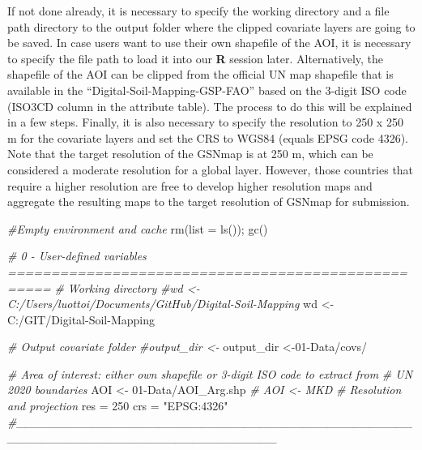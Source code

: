 \documentclass[
  10pt,
  b5paper,
  oneside]{book}
\newenvironment{Shaded}{\begin{snugshade}}{\end{snugshade}}
\newcommand{\AttributeTok}[1]{\textcolor[rgb]{0.77,0.63,0.00}{#1}}
\newcommand{\CommentTok}[1]{\textcolor[rgb]{0.56,0.35,0.01}{\textit{#1}}}
\newcommand{\DecValTok}[1]{\textcolor[rgb]{0.00,0.00,0.81}{#1}}
\newcommand{\FunctionTok}[1]{\textcolor[rgb]{0.00,0.00,0.00}{#1}}
\newcommand{\NormalTok}[1]{#1}
\newcommand{\OtherTok}[1]{\textcolor[rgb]{0.56,0.35,0.01}{#1}}
\newcommand{\StringTok}[1]{\textcolor[rgb]{0.31,0.60,0.02}{#1}}
\begin{document}
If not done already, it is necessary to specify the working directory and a file path directory to the output folder where the clipped covariate layers are going to be saved. In case users want to use their own shapefile of the AOI, it is necessary to specify the file path to load it into our \textbf{R} session later. Alternatively, the shapefile of the AOI can be clipped from the official UN map shapefile that is available in the ``Digital-Soil-Mapping-GSP-FAO'' based on the 3-digit ISO code (ISO3CD column in the attribute table). The process to do this will be explained in a few steps. Finally, it is also necessary to specify the resolution to 250 x 250 m for the covariate layers and set the CRS to WGS84 (equals EPSG code 4326). Note that the target resolution of the GSNmap is at 250 m, which can be considered a moderate resolution for a global layer. However, those countries that require a higher resolution are free to develop higher resolution maps and aggregate the resulting maps to the target resolution of GSNmap for submission.

\begin{Shaded}
\begin{Highlighting}[]
\CommentTok{\#Empty environment and cache}
\FunctionTok{rm}\NormalTok{(}\AttributeTok{list =} \FunctionTok{ls}\NormalTok{());}
\FunctionTok{gc}\NormalTok{()}

\CommentTok{\# 0 {-} User{-}defined variables ===================================================}
\CommentTok{\# Working directory}
\CommentTok{\#wd \textless{}{-} \textquotesingle{}C:/Users/luottoi/Documents/GitHub/Digital{-}Soil{-}Mapping\textquotesingle{}}
\NormalTok{wd }\OtherTok{\textless{}{-}} \StringTok{\textquotesingle{}C:/GIT/Digital{-}Soil{-}Mapping\textquotesingle{}}

\CommentTok{\# Output covariate folder}
\CommentTok{\#output\_dir \textless{}{-}\textquotesingle{}\textquotesingle{}}
\NormalTok{output\_dir }\OtherTok{\textless{}{-}}\StringTok{\textquotesingle{}01{-}Data/covs/\textquotesingle{}}

\CommentTok{\# Area of interest: either own shapefile or 3{-}digit ISO code to extract from }
\CommentTok{\# UN 2020 boundaries}
\NormalTok{AOI }\OtherTok{\textless{}{-}} \StringTok{\textquotesingle{}01{-}Data/AOI\_Arg.shp\textquotesingle{}}
\CommentTok{\# AOI \textless{}{-} \textquotesingle{}MKD\textquotesingle{}}
\CommentTok{\# Resolution and projection}
\NormalTok{res }\OtherTok{=} \DecValTok{250}
\NormalTok{crs }\OtherTok{=} \StringTok{"EPSG:4326"}
\CommentTok{\#\_\_\_\_\_\_\_\_\_\_\_\_\_\_\_\_\_\_\_\_\_\_\_\_\_\_\_\_\_\_\_\_\_\_\_\_\_\_\_\_\_\_\_\_\_\_\_\_\_\_\_\_\_\_\_\_\_\_\_\_\_\_\_\_\_\_\_\_\_\_\_\_\_\_\_\_\_\_\_}
\end{Highlighting}
\end{Shaded}
\end{document}
